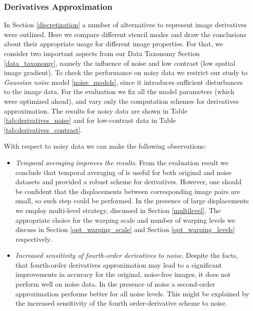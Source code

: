 \subsubsection{Derivatives Approximation}

In Section \ref{discretization} a number of alternatives to represent image derivatives were outlined. Here we  compare different stencil modes and draw the conclusions about their appropriate usage for different image properties. For that, we consider two important aspects from our Data Taxonomy Section \ref{data_taxonomy}, namely the influence of noise and low contrast (low spatial image gradient). To check the performance on noisy data we restrict our study to \textit{Gaussian noise} model \ref{noise_models}, since it introduces sufficient disturbances to the image data.
For the evaluation we fix all the model parameters (which were optimized ahead), and vary only the computation schemes for derivatives approximation. The results for noisy data are shown in Table \ref{tab:derivatives_noise} and for low-contrast data in Table \ref{tab:derivatives_contrast}. 

With respect to noisy data we can make the following observations: 
\begin{itemize}
	\item \textit{Temporal averaging improves the results}. From the evaluation result we conclude that temporal averaging of is useful for both original and noise datasets and provided a robust scheme for derivatives. However, one should be confident that the displacements between corresponding image pairs are small, so such step could be performed. In the presence of large displacements we employ multi-level strategy, discussed in Section \ref{multilevel}. The appropriate choice for the warping scale and number of warping levels we discuss in Section \ref{opt_warping_scale} and Section \ref{opt_warping_levels} respectively. 
	\item \textit{Increased sensitivity of fourth-order derivatives to noise}. Despite the facts, that fourth-order derivatives approximation may lead to a significant improvements in accuracy for the original, noise-free images, it does not perform well on noise data. In the presence of noise a second-order approximation performs better for all noise levels. This might be explained by the increased sensitivity of the fourth order-derivative scheme to noise.
\end{itemize}
    
